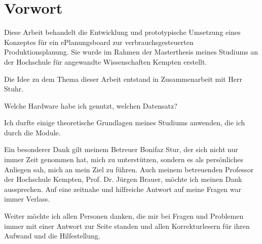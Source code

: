 \section*{Vorwort}

Diese Arbeit behandelt die \glqq Entwicklung und prototypische Umsetzung eines Konzeptes für ein ePlanungsboard zur verbrauchsgesteuerten Produktionsplanung\grqq. Sie wurde im Rahmen der Masterthesis meines Studiums an der Hochschule für angewandte Wissenschaften Kempten erstellt.

Die Idee zu dem Thema dieser Arbeit entstand in Zusammenarbeit mit Herr Stuhr. 

Welche Hardware habe ich genutzt, welchen Datensatz?

Ich durfte einige theoretische Grundlagen meines Studiums anwenden, die ich durch die Module. 

Ein besonderer Dank gilt meinem Betreuer Bonifaz Stur, der sich nicht nur immer Zeit genommen hat, mich zu unterstützen, sondern es als persönliches Anliegen sah, mich an mein Ziel zu führen. 
Auch meinem betreuenden Professor der Hochschule Kempten, Prof. Dr. Jürgen Brauer, möchte ich meinen Dank aussprechen. Auf eine zeitnahe und hilfreiche Antwort auf meine Fragen war immer Verlass. 

Weiter möchte ich allen Personen danken, die mir bei Fragen und Problemen immer mit einer Antwort zur Seite standen und allen Korrekturlesern für ihren Aufwand und die Hilfestellung.

